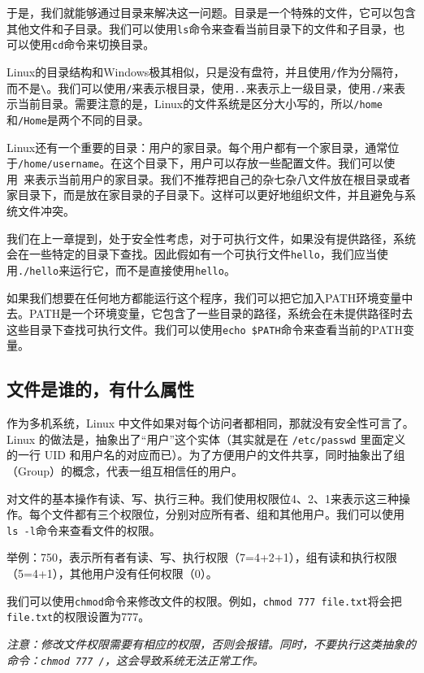 \documentclass[../main.tex]{subfiles}
\begin{document}
于是，我们就能够通过目录来解决这一问题。目录是一个特殊的文件，它可以包含其他文件和子目录。我们可以使用\texttt{ls}命令来查看当前目录下的文件和子目录，也可以使用\texttt{cd}命令来切换目录。

Linux的目录结构和Windows极其相似，只是没有盘符，并且使用\texttt{/}作为分隔符，而不是\texttt{\textbackslash}。我们可以使用\texttt{/}来表示根目录，使用\texttt{..}来表示上一级目录，使用\texttt{./}来表示当前目录。需要注意的是，Linux的文件系统是区分大小写的，所以\texttt{/home}和\texttt{/Home}是两个不同的目录。

Linux还有一个重要的目录：用户的家目录。每个用户都有一个家目录，通常位于\texttt{/home/username}。在这个目录下，用户可以存放一些配置文件。我们可以使用\texttt{~}来表示当前用户的家目录。我们不推荐把自己的杂七杂八文件放在根目录或者家目录下，而是放在家目录的子目录下。这样可以更好地组织文件，并且避免与系统文件冲突。

我们在上一章提到，处于安全性考虑，对于可执行文件，如果没有提供路径，系统会在一些特定的目录下查找。因此假如有一个可执行文件\texttt{hello}，我们应当使用\texttt{./hello}来运行它，而不是直接使用\texttt{hello}。

如果我们想要在任何地方都能运行这个程序，我们可以把它加入PATH环境变量中去。PATH是一个环境变量，它包含了一些目录的路径，系统会在未提供路径时去这些目录下查找可执行文件。我们可以使用\texttt{echo \$PATH}命令来查看当前的PATH变量。

\subsection{文件是谁的，有什么属性}

作为多机系统，Linux 中文件如果对每个访问者都相同，那就没有安全性可言了。Linux 的做法是，抽象出了“用户”这个实体（其实就是在 \texttt{/etc/passwd} 里面定义的一行 UID 和用户名的对应而已）。为了方便用户的文件共享，同时抽象出了组（Group）的概念，代表一组互相信任的用户。

对文件的基本操作有读、写、执行三种。我们使用权限位4、2、1来表示这三种操作。每个文件都有三个权限位，分别对应所有者、组和其他用户。我们可以使用\texttt{ls -l}命令来查看文件的权限。

举例：750，表示所有者有读、写、执行权限（7=4+2+1），组有读和执行权限（5=4+1），其他用户没有任何权限（0）。

我们可以使用\texttt{chmod}命令来修改文件的权限。例如，\texttt{chmod 777 file.txt}将会把\texttt{file.txt}的权限设置为777。

\emph{注意：修改文件权限需要有相应的权限，否则会报错。同时，不要执行这类抽象的命令：\texttt{chmod 777 /}，这会导致系统无法正常工作。}
\end{document}

